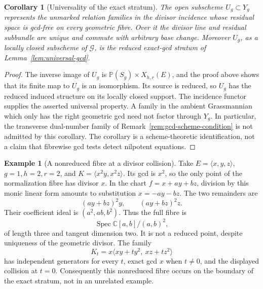 \documentclass[11pt,reqno]{amsart}
\numberwithin{equation}{section}
\newtheorem{corollary}[theorem]{Corollary}
\theoremstyle{definition}\newtheorem{definition}[theorem]{Definition}
\newtheorem{example}[theorem]{Example}
\theoremstyle{remark}\newtheorem{remark}[theorem]{Remark}
\newcommand{\C}{\mathbb C}\newcommand{\Q}{\mathbb Q}
\newcommand{\Pj}{\mathbb P}\newcommand{\A}{\mathbb A}
\DeclareMathOperator{\Spec}{Spec}\DeclareMathOperator{\PGL}{PGL}
\begin{document}
\begin{corollary}[Universality of the exact stratum]
\label{cor:canonical-exact-v151}
The open subscheme \(U_g\subset Y_g\) represents the unmarked
relation families in the divisor incidence whose residual space is
gcd-free on every geometric fibre.  Over it the divisor line and
residual subbundle are unique and commute with arbitrary base change.
Moreover \(U_g\), as a locally closed subscheme of \(\mathscr G\),
is the reduced exact-gcd stratum of Lemma~\ref{lem:universal-gcd}.
\end{corollary}
\begin{proof}
The inverse image of \(U_g\) is
\(\Pj(S_g)\times X_{h,r}(E)\), and the proof above shows that its
finite map to \(U_g\) is an isomorphism.  Its source is reduced,
so \(U_g\) has the reduced induced structure on its locally closed
support.  The incidence functor supplies the asserted universal
property.  A family in the ambient Grassmannian which only has the
right geometric gcd need not factor through \(Y_g\).  In particular,
the transverse dual-number family of
Remark~\ref{rem:gcd-scheme-condition} is not admitted by this
corollary.  The corollary is a scheme-theoretic identification, not a
claim that fibrewise gcd tests detect nilpotent equations.
\end{proof}

\begin{example}[A nonreduced fibre at a divisor collision]
\label{ex:fat-divisor-fibre-v151}
Take \(E=\langle x,y,z\rangle\), \(g=1,h=2,r=2\), and
\(K=\langle x^2y,x^2z\rangle\).  Its gcd is \(x^2\), so the only
point of the normalization fibre has divisor \(x\).  In the chart
\(f=x+ay+bz\), division by this monic linear form amounts to
substitution \(x=-ay-bz\).  The two remainders are
\[
             (ay+bz)^2y,\qquad (ay+bz)^2z.
\]
Their coefficient ideal is \((a^2,ab,b^2)\).  Thus the full fibre is
\begin{equation}\label{eq:fat-fibre-v151}
                     \Spec\C[a,b]/(a,b)^2,
\end{equation}
of length three and tangent dimension two.  It is not a reduced
point, despite uniqueness of the geometric divisor.  The family
\[
 K_t=x\langle xy+t y^2,\ xz+t z^2\rangle
\]
has independent generators for every \(t\), exact gcd \(x\) when
\(t\ne0\), and the displayed collision at \(t=0\).  Consequently
this nonreduced fibre occurs on the boundary of the exact stratum,
not in an unrelated example.
\end{example}
\end{document}
